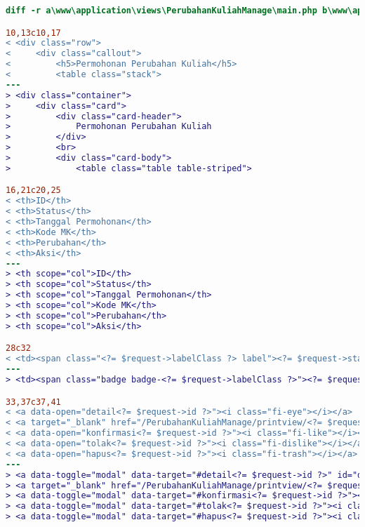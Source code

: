 \begin{lstlisting}[language=diff, caption=Perubahan file \path{\views\PerubahanKuliahManage\main.php},  basicstyle=\ttfamily, frame=single,
columns=fullflexible, keepspaces=true, breaklines=true, label={lst:mainPerubahanKuliahManage}]
diff -r a\www\application\views\PerubahanKuliahManage\main.php b\www\application\views\PerubahanKuliahManage\main.php

10,13c10,17
< <div class="row">
<     <div class="callout">
<         <h5>Permohonan Perubahan Kuliah</h5>
<         <table class="stack">
---
> <div class="container">
>     <div class="card">
>         <div class="card-header">
>             Permohonan Perubahan Kuliah
>         </div>
>         <br>
>         <div class="card-body">
>             <table class="table table-striped">

16,21c20,25
< <th>ID</th>
< <th>Status</th>
< <th>Tanggal Permohonan</th>
< <th>Kode MK</th>
< <th>Perubahan</th>
< <th>Aksi</th>
---
> <th scope="col">ID</th>
> <th scope="col">Status</th>
> <th scope="col">Tanggal Permohonan</th>
> <th scope="col">Kode MK</th>
> <th scope="col">Perubahan</th>
> <th scope="col">Aksi</th>

28c32
< <td><span class="<?= $request->labelClass ?> label"><?= $request->status ?></span></td>
---
> <td><span class="badge badge-<?= $request->labelClass ?>"><?= $request->status ?></span></td>

33,37c37,41
< <a data-open="detail<?= $request->id ?>"><i class="fi-eye"></i></a>
< <a target="_blank" href="/PerubahanKuliahManage/printview/<?= $request->id ?>"><i class="fi-print"></i></a>
< <a data-open="konfirmasi<?= $request->id ?>"><i class="fi-like"></i></a>                                    
< <a data-open="tolak<?= $request->id ?>"><i class="fi-dislike"></i></a>
< <a data-open="hapus<?= $request->id ?>"><i class="fi-trash"></i></a>
---
> <a data-toggle="modal" data-target="#detail<?= $request->id ?>" id="detailIkon<?= $request->id ?>"><i class="fas fa-eye blueiconcolor"></i></a>
> <a target="_blank" href="/PerubahanKuliahManage/printview/<?= $request->id ?>"><i class="fas fa-print"></i></a>
> <a data-toggle="modal" data-target="#konfirmasi<?= $request->id ?>"><i class="fas fa-thumbs-up"></i></a>
> <a data-toggle="modal" data-target="#tolak<?= $request->id ?>"><i class="fas fa-thumbs-down"></i></a>
> <a data-toggle="modal" data-target="#hapus<?= $request->id ?>"><i class="fas fa-trash"></i></a>


\end{lstlisting}
